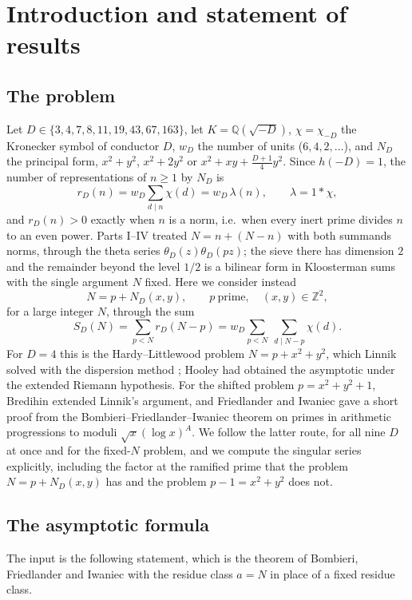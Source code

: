 \documentclass[11pt]{amsart}
\theoremstyle{definition}
\theoremstyle{remark}
\newcommand{\Z}{\mathbb Z}
\begin{document}
\section{Introduction and statement of results}\label{sec:intro}

\subsection{The problem}
Let $D\in\{3,4,7,8,11,19,43,67,163\}$, let $K=\mathbb Q(\sqrt{-D})$, $\chi=\chi_{-D}$ the Kronecker symbol of conductor $D$, $w_D$ the number of units ($6,4,2,\dots$), and $N_D$ the principal form, $x^2+y^2$, $x^2+2y^2$ or $x^2+xy+\frac{D+1}4y^2$. Since $h(-D)=1$, the number of representations of $n\ge1$ by $N_D$ is
\[
r_D(n)=w_D\sum_{d\mid n}\chi(d)=w_D\,\lambda(n),\qquad \lambda=1*\chi,
\]
and $r_D(n)>0$ exactly when $n$ is a norm, i.e.\ when every inert prime divides $n$ to an even power. Parts I--IV \cite{ChenI,ChenII,ChenIII,ChenIV} treated $N=n+(N-n)$ with both summands norms, through the theta series $\theta_D(z)\theta_D(pz)$; the sieve there has dimension $2$ and the remainder beyond the level $1/2$ is a bilinear form in Kloosterman sums with the single argument $N$ fixed. Here we consider instead
\[
N=p+N_D(x,y),\qquad p\ \text{prime},\quad (x,y)\in\Z^2,
\]
for a large integer $N$, through the sum
\[
S_D(N)=\sum_{p<N}r_D(N-p)=w_D\sum_{p<N}\ \sum_{d\mid N-p}\chi(d).
\]
For $D=4$ this is the Hardy--Littlewood problem $N=p+x^2+y^2$, which Linnik solved with the dispersion method \cite[Chapter~7]{Linnik}; Hooley \cite{Hooley57} had obtained the asymptotic under the extended Riemann hypothesis. For the shifted problem $p=x^2+y^2+1$, Bredihin \cite{Bredihin} extended Linnik's argument, and Friedlander and Iwaniec \cite{FI18} gave a short proof from the Bombieri--Friedlander--Iwaniec theorem \cite{BFI89} on primes in arithmetic progressions to moduli $\sqrt x(\log x)^A$. We follow the latter route, for all nine $D$ at once and for the fixed-$N$ problem, and we compute the singular series explicitly, including the factor at the ramified prime that the problem $N=p+N_D(x,y)$ has and the problem $p-1=x^2+y^2$ does not.

\subsection{The asymptotic formula}
The input is the following statement, which is the theorem of Bombieri, Friedlander and Iwaniec \cite[Theorem]{BFI89} with the residue class $a=N$ in place of a fixed residue class.
\end{document}
